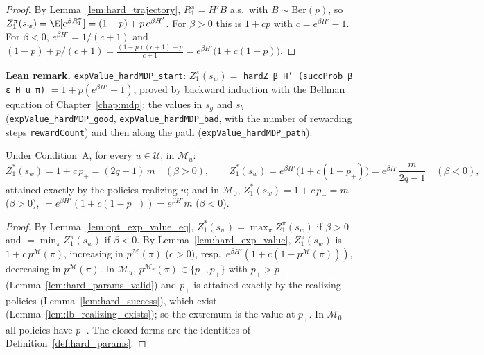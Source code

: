 \begin{proof}
\leanok
{}
By Lemma~\ref{lem:hard_trajectory}, $R^\pi_1 = H' B$ a.s.\ with $B \sim \mathrm{Ber}(p)$, so
$Z^\pi_1(s_w) = \E[e^{\beta R^\pi_1}] = (1 - p) + p\,e^{\beta H'}$. For $\beta > 0$ this is
$1 + c p$ with $c = e^{\beta H'} - 1$. For $\beta < 0$, $e^{\beta H'} = 1/(c+1)$ and
$(1-p) + p/(c+1) = \frac{(1-p)(c+1) + p}{c+1} = e^{\beta H'}\big(1 + c(1-p)\big)$.
\end{proof}

\textbf{Lean remark.} \texttt{expValue\_hardMDP\_start}: $Z^\pi_1(s_w) = $ \texttt{hardZ β H' (succProb β ε H u π)}
$= 1 + p(e^{\beta H'} - 1)$, proved by backward induction with the Bellman equation of Chapter~\ref{chap:mdp}:
the values in $s_g$ and $s_b$ (\texttt{expValue\_hardMDP\_good}, \texttt{expValue\_hardMDP\_bad}, with the
number of rewarding steps \texttt{rewardCount}) and then along the path (\texttt{expValue\_hardMDP\_path}).

\begin{lemma}\label{lem:hard_opt_value}
Under Condition~A, for every $u \in \mathcal U$, in $\mathcal M_u$:
\[
  Z^*_1(s_w) = 1 + c\,p_+ = (2q-1)\,m \quad (\beta > 0), \qquad
  Z^*_1(s_w) = e^{\beta H'}\big(1 + c(1 - p_+)\big) = e^{\beta H'}\frac{m}{2q-1} \quad (\beta < 0),
\]
attained exactly by the policies realizing $u$; and in $\mathcal M_0$, $Z^*_1(s_w) = 1 + c\,p_- = m$
($\beta > 0$), $= e^{\beta H'}(1 + c(1-p_-)) = e^{\beta H'} m$ ($\beta < 0$).
\end{lemma}

\begin{proof}
By Lemma~\ref{lem:opt_exp_value_eq}, $Z^*_1(s_w) = \max_\pi Z^\pi_1(s_w)$ if $\beta > 0$ and
$= \min_\pi Z^\pi_1(s_w)$ if $\beta < 0$. By Lemma~\ref{lem:hard_exp_value}, $Z^\pi_1(s_w)$ is
$1 + c\,p^{\mathcal M}(\pi)$, increasing in $p^{\mathcal M}(\pi)$ ($c > 0$), resp.\
$e^{\beta H'}(1 + c(1 - p^{\mathcal M}(\pi)))$, decreasing in $p^{\mathcal M}(\pi)$. In
$\mathcal M_u$, $p^{\mathcal M_u}(\pi) \in \{p_-, p_+\}$ with $p_+ > p_-$
(Lemma~\ref{lem:hard_params_valid}) and $p_+$ is attained exactly by the realizing policies
(Lemma~\ref{lem:hard_success}), which exist (Lemma~\ref{lem:lb_realizing_exists}); so the
extremum is the value at $p_+$. In $\mathcal M_0$ all policies have $p_-$. The closed forms
are the identities of Definition~\ref{def:hard_params}.
\end{proof}

